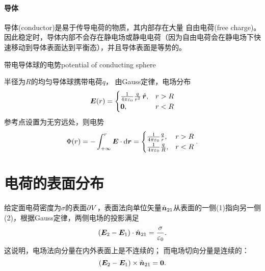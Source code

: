 \paragraph{导体}
导体(conductor)是易于传导电荷的物质，其内部存在大量%
自由电荷(free charge)。因此稳定时，导体内部不会存在静电场或静电电荷（因为自由电荷会在静电场下快速移动到导体表面达到平衡态），并且导体表面是等势的。
\begin{example}{带电导体球的电势}{potential of conducting sphere}

    半径为$R$的均匀导体球携带电荷$q$，%
    由Gauss定律，电场分布
    \[
        \bm E(r)=
        \begin{cases}
            \frac1{4\pi\varepsilon_0}\frac q{r^2}\mathop{}\!\hat{\bm{r}},&r>R\\
            \bm 0,&r<R
        \end{cases}
    \]
    参考点设置为无穷远处，则电势
    \[
        \Phi(r)=-\int_{+\infty}^r\bm E\cdot\mathop{}\!\mathrm{d}\bm r=
        \begin{cases}
            \frac1{4\pi\varepsilon_0}\frac qr,&r>R\\
            \frac1{4\pi\varepsilon_0}\frac qR,&r<R
        \end{cases}.
    \]
\end{example}

\section{电荷的表面分布}

给定面电荷密度为$\sigma$的表面$\partial V$，表面法向单位矢量$\mathop{}\!\hat{\bm{n}}_{21}$从表面的一侧(1)指向另一侧(2)，根据Gauss定律，两侧电场的投影满足
\begin{equation}
    \label{eqn:En2-En1}
    (\bm E_2-\bm E_1)\cdot\mathop{}\!\hat{\bm{n}}_{21}=\frac\sigma{\varepsilon_0}.
\end{equation}
这说明，电场法向分量在内外表面上是不连续的；
而电场切向分量是连续的：
\begin{equation}
    (\bm E_2-\bm E_1)\times\mathop{}\!\hat{\bm{n}}_{21}=\bm 0.
\end{equation}

